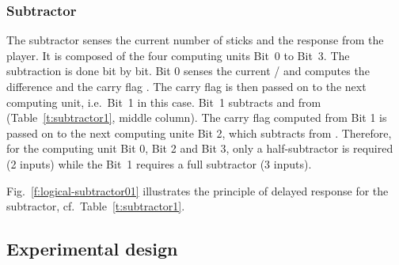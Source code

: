 \documentclass[12pt,notitlepage]{article}
\newcommand{\hh}[1]{{\color{Purple}#1}}
\begin{document}



\subsubsection*{Subtractor} \label{ss:sub}

\hh{
The subtractor senses the current number of sticks and 
the response from the player. 
%
It is composed of 
the four computing units Bit~0 to Bit~3.
%
The subtraction is done bit by bit. 
%
Bit 0 senses the current \ce{s_0}/\ce{r_0}
and computes the difference \ce{d_0} and the carry flag \ce{c_1}.
%
The carry flag is then passed on to the next computing unit, 
i.e.~Bit~1 in this case. 
%
Bit~1 subtracts \ce{r_1} and \ce{c_1} from \ce{s_1}
(Table~\ref{t:subtractor1}, middle column). 
%
The carry flag \ce{c_2} computed from Bit 1 is passed on 
to the next computing unite Bit 2, 
which subtracts \ce{c_2} from \ce{s_2}.
%
Therefore, for the computing unit Bit 0, Bit 2 and Bit 3,
only a half-subtractor is required (2 inputs)
while the Bit~1 requires a full subtractor (3 inputs).
}



%
Fig.~\ref{f:logical-subtractor01}
illustrates the principle of delayed response
for the subtractor,
cf.~Table~\ref{t:subtractor1}.








\subsection{Experimental design} \label{ss:experiment}
\end{document}
